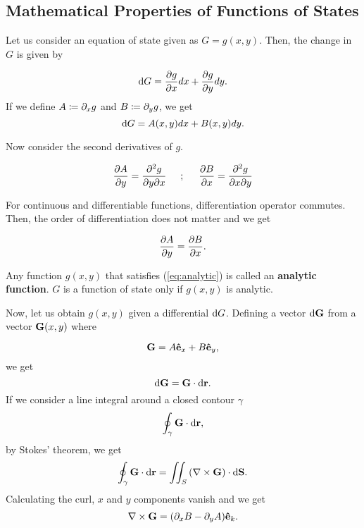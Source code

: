 \subsection{Mathematical Properties of Functions of States}
\label{subsec:1.2.1mathematicalproperties}
    Let us consider an equation of state given as $G=g(x,y)$. Then, the change in $G$ is given by
    
    \begin{equation}
        \text{d} G = \frac{\partial g}{\partial x}dx + \frac{\partial g}{\partial y}dy .
    \end{equation}
    If we define $A \coloneqq \partial_xg$ and $B \coloneqq \partial_yg$, we get
    \begin{equation}
        \text{d} G = A(x,y)dx + B(x,y)dy.
    \end{equation}
    
    Now consider the second derivatives of $g$. 
    
    \begin{equation}
        \frac{\partial A}{\partial y} = \frac{\partial ^2g}{\partial y\partial x} \hspace{0.5cm};\hspace{0.5cm} \frac{\partial B}{\partial x} = \frac{\partial ^2g}{\partial x\partial y}
    \end{equation}
    
    For continuous and differentiable functions, differentiation operator commutes. Then, the order of differentiation does not matter and we get
    
    \begin{equation}
        \frac{\partial A}{\partial y} = \frac{\partial B}{\partial x}.
        \label{eq:analytic}
    \end{equation}
    
    Any function $g(x,y)$ that satisfies (\ref{eq:analytic}) is called an \textbf{analytic function}. $G$ is a function of state only if $g(x,y)$ is analytic. 
    
    Now, let us obtain $g(x,y)$ given a differential $\text{d} G$. Defining a vector $\text{d}\mathbf{G}$ from a vector $\mathbf{G}(x,y)$ where
    
    \begin{equation}
        \mathbf{G} = A\mathbf{\hat{e}}_{x} + B\mathbf{\hat{e}}_{y},
    \end{equation}
    we get
    \begin{equation}
        \text{d}\mathbf{G} = \mathbf{G}\cdot \text{d}\mathbf{r}.
    \end{equation}
    If we consider a line integral around a closed contour $\gamma$
    \begin{equation}
        \oint_\gamma \mathbf{G}\cdot\text{d}\mathbf{r},
    \end{equation}
    by Stokes' theorem, we get
    \begin{equation}
        \oint_\gamma \mathbf{G}\cdot\text{d}\mathbf{r} = \iint_S\left( \nabla\times\mathbf{G} \right)\cdot\text{d}\mathbf{S}.
    \end{equation}
    Calculating the curl, $x$ and $y$ components vanish and we get
    \begin{equation}
        \nabla\times\mathbf{G} = (\partial_xB-\partial_yA)\mathbf{\hat{e}}_{k}.
    \end{equation}
    
